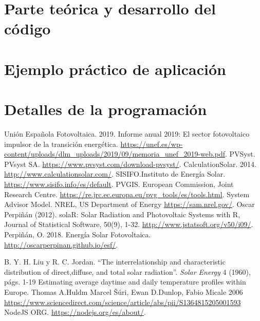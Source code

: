 \documentclass[11pt]{report}
\begin{document}
\chapter{Parte teórica y desarrollo del código}
\label{sec:theory}


\chapter{Ejemplo práctico de aplicación}


\chapter{Detalles de la programación}


\pagebreak

\begin{thebibliography}{99}

 Unión Española Fotovoltaica. 2019. Informe anual 2019: El sector fotovoltaico impulsor de la transición energética. \url{https://unef.es/wp-content/uploads/dlm_uploads/2019/09/memoria_unef_2019-web.pdf}.  
 PVSyst. PVsyst SA.  \url{https://www.pvsyst.com/download-pvsyst/}.  
 CalculationSolar. 2014. \url{http://www.calculationsolar.com/}.
 SISIFO.Instituto de Energía Solar.  \url{https://www.sisifo.info/es/default}.  
 PVGIS. European Commission, Joint Research Centre. \url{https://re.jrc.ec.europa.eu/pvg_tools/es/tools.html}.  
 System Advisor Model. NREL, US Department of Energy \url{https://sam.nrel.gov/}.
   Oscar Perpiñán (2012). solaR: Solar Radiation and Photovoltaic
  Systems with R, Journal of Statistical Software, 50(9), 1-32. \url{http://www.jstatsoft.org/v50/i09/}.  
 Perpiñán, O. 2018. Energía Solar Fotovoltaica. \url{http://oscarperpinan.github.io/esf/}.

B. Y. H. Liu y R. C. Jordan. “The interrelationship and characteristic distribution of direct,diffuse, and total solar radiation”. \textit{Solar Energy} 4 (1960), págs. 1-19
 Estimating average daytime and daily temperature profiles within Europe.  Thomas A.Huldm Marcel Šúri, Ewan D.Dunlop, Fabio Micale 2006  \url{https://www.sciencedirect.com/science/article/abs/pii/S1364815205001593}
 NodeJS ORG.  \url{https://nodejs.org/es/about/}.  

\end{thebibliography}
\end{document}
